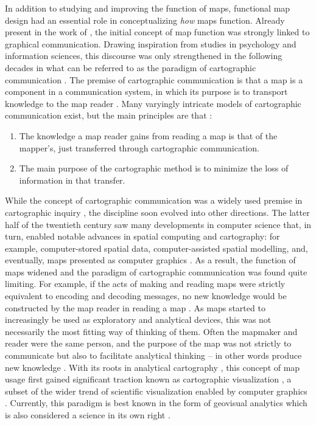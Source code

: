 In addition to studying and improving the function of maps,
functional map design had an essential role in conceptualizing \textit{how} maps function.
Already present in the work of \textcite{rob1952},
the initial concept of map function was strongly linked to graphical communication.
Drawing inspiration from studies in psychology and information sciences,
this discourse was only strengthened in the following decades
in what can be referred to as the paradigm of cartographic communication \parencite{fai2021}.
The premise of cartographic communication is
that a map is a component in a communication system,
in which its purpose is to transport knowledge to the map reader
\parencite{Boa2017}.
Many varyingly intricate models of cartographic communication exist,
but the main principles are that \parencite{ken2018}:
\begin{enumerate}
	\item The knowledge a map reader gains from reading a map is that of the mapper's,
	just transferred through cartographic communication.
	\item The main purpose of the cartographic method is
	to minimize the loss of information in that transfer.
\end{enumerate}

While the concept of cartographic communication was
a widely used premise in cartographic inquiry \parencite{ken2018},
the discipline soon evolved into other directions.
The latter half of the twentieth century saw many developments in computer science
that, in turn, enabled notable advances in spatial computing and cartography:
for example, computer-stored spatial data,
computer-assisted spatial modelling, and, eventually,
maps presented as computer graphics \parencite{kai2020}.
As a result, the function of maps widened
and the paradigm of cartographic communication was found quite limiting.
For example, if the acts of making and reading maps were strictly equivalent to
encoding and decoding messages,
no new knowledge would be constructed by the map reader in reading a map \parencite{mac2004}.
As maps started to increasingly be used
as exploratory and analytical devices,
this was not necessarily the most fitting way of thinking of them.
Often the mapmaker and reader were the same person,
and the purpose of the map was not strictly to communicate
but also to facilitate analytical thinking
-- in other words produce new knowledge \parencite{tob2000, ant1999, kry1995}.
With its roots in analytical cartography \parencite{tob1976},
this concept of map usage first gained significant traction known as
cartographic visualization \parencite{ant1999},
a subset of the wider trend of scientific visualization
enabled by computer graphics \parencite{nie1997}.
Currently, this paradigm is best known in the form of geovisual analytics
which is also considered a science in its own right \parencite{rob2017b}.


